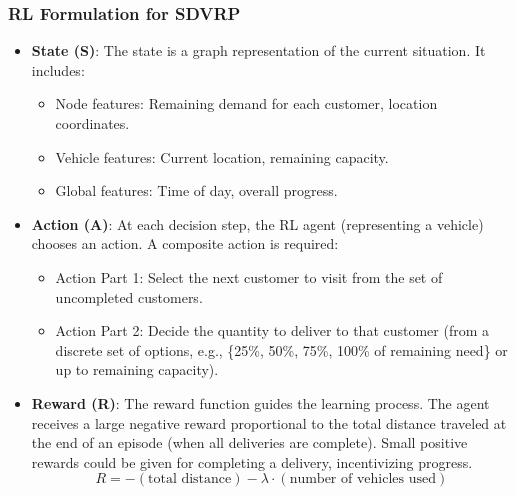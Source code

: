 \documentclass{article}
\begin{document}
\subsubsection{RL Formulation for SDVRP}
\begin{itemize}
    \item \textbf{State (S)}: The state is a graph representation of the current situation. It includes:
    \begin{itemize}
        \item Node features: Remaining demand for each customer, location coordinates.
        \item Vehicle features: Current location, remaining capacity.
        \item Global features: Time of day, overall progress.
    \end{itemize}
    \item \textbf{Action (A)}: At each decision step, the RL agent (representing a vehicle) chooses an action. A composite action is required:
    \begin{itemize}
        \item Action Part 1: Select the next customer to visit from the set of uncompleted customers.
        \item Action Part 2: Decide the quantity to deliver to that customer (from a discrete set of options, e.g., \{25\%, 50\%, 75\%, 100\% of remaining need\} or up to remaining capacity).
    \end{itemize}
    \item \textbf{Reward (R)}: The reward function guides the learning process. The agent receives a large negative reward proportional to the total distance traveled at the end of an episode (when all deliveries are complete). Small positive rewards could be given for completing a delivery, incentivizing progress.
    \begin{equation}
    R = -(\text{total distance}) - \lambda \cdot (\text{number of vehicles used})
    \end{equation}
\end{itemize}
\end{document}
